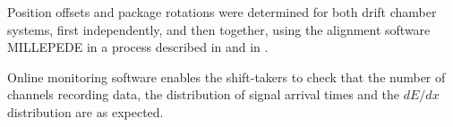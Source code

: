 Position offsets and package rotations were determined for both drift chamber systems, first independently, and then together, using the alignment software MILLEPEDE\cite{millepede} in a process described in \cite{GlueXCDCNIM} and in \cite{MikeStaib_thesis}.

Online monitoring software enables the shift-takers to check that the number of channels recording data, the distribution of signal arrival times and the  $dE/dx$ distribution are as expected. 


 
 
